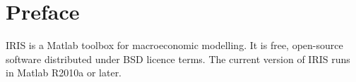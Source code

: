 \section *{Preface}

IRIS is a Matlab\raisebox{0.3em}{\tiny\textregistered} toolbox for macroeconomic modelling. It is free, open-source software distributed under BSD licence terms. The current version of IRIS runs in Matlab R2010a or later.
